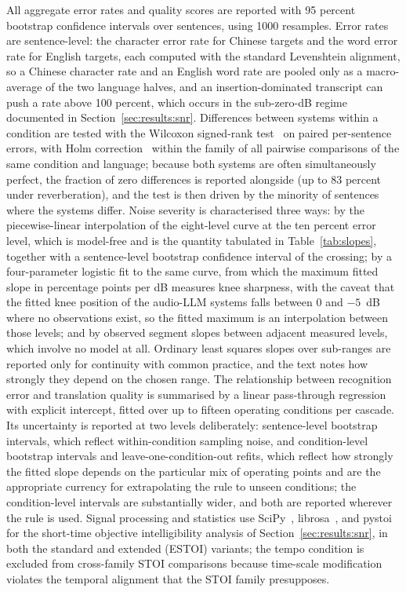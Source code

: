 All aggregate error rates and quality scores are reported with 95 percent
bootstrap confidence intervals over sentences, using 1000 resamples. Error
rates are sentence-level: the character error rate for Chinese targets and
the word error rate for English targets, each computed with the standard
Levenshtein alignment, so a Chinese character rate and an English word rate
are pooled only as a macro-average of the two language halves, and an
insertion-dominated transcript can push a rate above 100 percent, which
occurs in the sub-zero-dB regime documented in
Section~\ref{sec:results:snr}. Differences between systems within a
condition are tested with the Wilcoxon signed-rank test~\cite{wilcoxon1945individual}
on paired per-sentence errors, with Holm correction~\cite{holm1979simple}
within the family of all pairwise comparisons of the same condition and
language; because both systems are often simultaneously perfect, the
fraction of zero differences is reported alongside (up to 83 percent under
reverberation), and the test is then driven by the minority of sentences
where the systems differ. Noise severity is characterised three ways: by
the piecewise-linear interpolation of the eight-level curve at the ten
percent error level, which is model-free and is the quantity tabulated in
Table~\ref{tab:slopes}, together with a sentence-level bootstrap
confidence interval of the crossing; by a four-parameter logistic fit to
the same curve, from which the maximum fitted slope in percentage points
per dB measures knee sharpness, with the caveat that the fitted knee
position of the audio-LLM systems falls between 0 and $-5$~dB where no
observations exist, so the fitted maximum is an interpolation between
those levels; and by observed segment slopes between adjacent measured
levels, which involve no model at all. Ordinary least squares slopes over
sub-ranges are reported only for continuity with common practice, and the
text notes how strongly they depend on the chosen range. The relationship
between recognition error and translation quality is summarised by a
linear pass-through regression with explicit intercept, fitted over up to
fifteen operating conditions per cascade. Its uncertainty is reported at
two levels deliberately: sentence-level bootstrap intervals, which reflect
within-condition sampling noise, and condition-level bootstrap intervals
and leave-one-condition-out refits, which reflect how strongly the fitted
slope depends on the particular mix of operating points and are the
appropriate currency for extrapolating the rule to unseen conditions; the
condition-level intervals are substantially wider, and both are reported
wherever the rule is used. Signal processing and statistics use
SciPy~\cite{virtanen2020scipy}, librosa~\cite{mcfee2015librosa}, and
pystoi for the short-time objective intelligibility analysis of
Section~\ref{sec:results:snr}, in both the standard and extended (ESTOI)
variants; the tempo condition is excluded from cross-family STOI
comparisons because time-scale modification violates the temporal
alignment that the STOI family presupposes.

